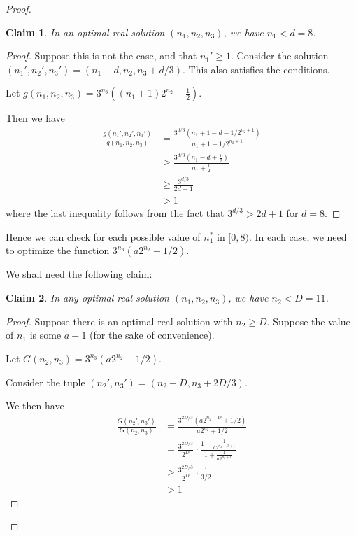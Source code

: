 \documentclass[answers]{exam}
\newtheorem{claim}{Claim}
\begin{document}
\begin{questions}
\begin{solution}
\begin{proof}
\begin{claim}
    In an optimal real solution $(n_1, n_2, n_3)$, we have $n_1 < d = 8$.
\end{claim}
\begin{proof}
    Suppose this is not the case, and that $n_1' \ge 1$. Consider the solution $(n_1', n_2', n_3') = (n_1 - d, n_2, n_3 + d/3)$. This also satisfies the conditions.
    
    Let $g(n_1, n_2, n_3) = 3^{n_3}((n_1 + 1) 2^{n_2} - \frac{1}{2})$.
    
    Then we have 
    \begin{align*}
    \frac{g(n_1', n_2', n_3')}{g(n_1, n_2, n_3)} 
    &= \frac{3^{d/3} (n_1 + 1 - d - 1/2^{n_2 + 1})}{n_1 + 1 - 1/2^{n_2 + 1}}\\
    &\ge \frac{3^{d/3}(n_1 - d + \frac{1}{2})}{n_1 + \frac{1}{2}}\\
    &\ge \frac{3^{d/3}}{2d + 1}\\
    &> 1
    \end{align*}
    where the last inequality follows from the fact that $3^{d/3} > 2d + 1$ for $d = 8$.
\end{proof}

Hence we can check for each possible value of $n_1^*$ in $[0, 8)$. In each case, we need to optimize the function $3^{n_3}(a 2^{n_2} - 1/2)$.

We shall need the following claim:

\begin{claim}
    In any optimal real solution $(n_1, n_2, n_3)$, we have $n_2 < D = 11$.
\end{claim}
\begin{proof}
    Suppose there is an optimal real solution with $n_2 \ge D$.
    Suppose the value of $n_1$ is some $a - 1$ (for the sake of convenience). 
    
    Let $G(n_2, n_3) = 3^{n_3}(a2^{n_2} - 1/2)$.
    
    Consider the tuple $(n_2', n_3') = (n_2 - D, n_3 + 2D/3)$.
    
    We then have 
    \begin{align*}
        \frac{G(n_2', n_3')}{G(n_2, n_3)} 
        &= \frac{3^{2D/3} (a2^{n_2 - D} + 1/2)}{a2^{n_2} + 1/2}\\
        &= \frac{3^{2D/3}}{2^D} \cdot \frac{1 + \frac{1}{a2^{n_2 - D + 1}}}{1 + \frac{1}{a2^{n_2 + 1}}}\\
        &\ge \frac{3^{2D/3}}{2^D} \cdot \frac{1}{3/2}\\
        &> 1
    \end{align*}
    

\end{proof}
\end{proof}
\end{solution}
\end{questions}
\end{document}

